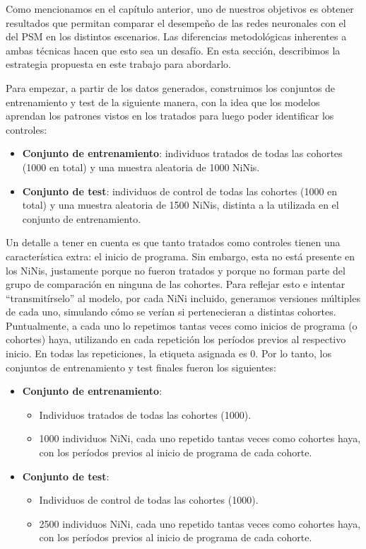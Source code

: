 \documentclass[../../main.tex]{subfiles}
\begin{document}
Como mencionamos en el capítulo anterior, uno de nuestros objetivos es obtener resultados
que permitan comparar el desempeño de las redes neuronales con el del PSM en los
distintos escenarios. Las diferencias metodológicas inherentes a ambas técnicas hacen que
esto sea un desafío. En esta sección, describimos la estrategia propuesta en este trabajo
para abordarlo.

Para empezar, a partir de los datos generados, construimos los conjuntos de entrenamiento
y test de la siguiente manera, con la idea que los modelos aprendan los patrones vistos en
los tratados para luego poder identificar los controles:
\begin{itemize}
    \item \textbf{Conjunto de entrenamiento}: individuos tratados de todas las cohortes
    (1000 en total) y una muestra aleatoria de 1000 NiNis.
    \item \textbf{Conjunto de test}: individuos de control de todas las cohortes (1000 en
    total) y una muestra aleatoria de 1500 NiNis, distinta a la utilizada en el conjunto
    de entrenamiento.
\end{itemize}

Un detalle a tener en cuenta es que tanto tratados como controles tienen una
característica extra: el inicio de programa. Sin embargo, esta no está presente en los
NiNis, justamente porque no fueron tratados y porque no forman parte del grupo de
comparación en ninguna de las cohortes. Para reflejar esto e intentar ``transmitírselo''
al modelo, por cada NiNi incluido, generamos versiones múltiples de cada uno, simulando
cómo se verían si pertenecieran a distintas cohortes. Puntualmente, a cada uno lo
repetimos tantas veces como inicios de programa (o cohortes) haya, utilizando en cada
repetición los períodos previos al respectivo inicio. En todas las repeticiones, la
etiqueta asignada es 0. Por lo tanto, los conjuntos de entrenamiento y test finales fueron
los siguientes:
\begin{itemize}
    \item \textbf{Conjunto de entrenamiento}:
        \begin{itemize}
            \item Individuos tratados de todas las cohortes (1000).
            \item 1000 individuos NiNi, cada uno repetido tantas veces como cohortes haya,
            con los períodos previos al inicio de programa de cada cohorte.
        \end{itemize}
    \item \textbf{Conjunto de test}:
        \begin{itemize}
            \item Individuos de control de todas las cohortes (1000).
            \item 2500 individuos NiNi, cada uno repetido tantas veces como cohortes haya,
            con los períodos previos al inicio de programa de cada cohorte.
        \end{itemize}
\end{itemize}
\end{document}
